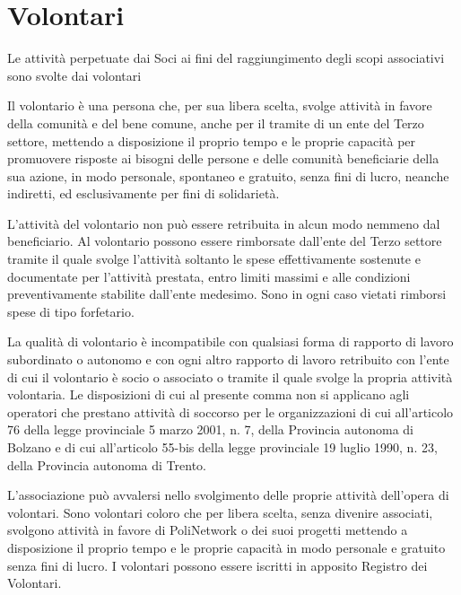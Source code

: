 \documentclass[legalpaper, 11pt]{exam}
\let\tempone\enumerate
\let\temptwo\endenumerate
\renewenvironment{enumerate}{\tempone\addtolength{\itemsep}{-0.45\baselineskip}}{\temptwo}
\begin{document}
{\section{Volontari}
\begin{enumerate}
 \item Le attività perpetuate dai Soci ai fini del raggiungimento degli scopi associativi sono svolte dai volontari
 \item  Il volontario è una persona che, per sua libera scelta, svolge attività in favore della comunità e del bene comune, anche per il tramite di un ente del Terzo settore, mettendo a disposizione il proprio tempo e le proprie capacità per promuovere risposte ai bisogni delle persone e delle comunità beneficiarie della sua azione, in modo personale, spontaneo e gratuito, senza fini di lucro, neanche indiretti, ed esclusivamente per fini di solidarietà.
 \item L’attività del volontario non può essere retribuita in alcun modo nemmeno dal beneficiario. Al volontario possono essere rimborsate dall’ente del Terzo settore tramite il quale svolge l’attività soltanto le spese effettivamente sostenute e documentate per l’attività prestata, entro limiti massimi e alle condizioni preventivamente stabilite dall’ente medesimo. Sono in ogni caso vietati rimborsi spese di tipo forfetario.
\item La qualità di volontario è incompatibile con qualsiasi forma di rapporto di lavoro subordinato o autonomo e con ogni altro rapporto di lavoro retribuito con l’ente di cui il volontario è socio o associato o tramite il quale svolge la propria attività volontaria. Le disposizioni di cui al presente comma non si applicano agli operatori che prestano attività di soccorso per le organizzazioni di cui all’articolo 76 della legge provinciale 5 marzo 2001, n. 7, della Provincia autonoma di Bolzano e di cui all’articolo 55-bis della legge provinciale 19 luglio 1990, n. 23, della Provincia autonoma di Trento.
 \item L’associazione può avvalersi nello svolgimento delle proprie attività dell’opera di volontari. Sono volontari coloro che per libera scelta, senza divenire associati, svolgono attività in favore di PoliNetwork o dei suoi progetti mettendo a disposizione il proprio tempo e le proprie capacità in modo personale e gratuito senza fini di lucro. I volontari possono essere iscritti in apposito Registro dei Volontari.
\end{enumerate}

}
\end{document}
